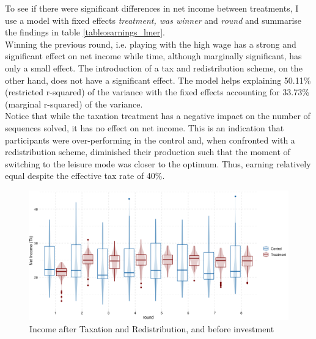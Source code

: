 To see if there were significant differences in net income between treatments, I use a model with fixed effects \textit{treatment, was winner} and \textit{round} and summarise the findings in table \ref{table:earnings_lmer}.\\

Winning the previous round, i.e. playing with the high wage has a strong and significant effect on net income while time, although marginally significant, has only a small effect. The introduction of a tax and redistribution scheme, on the other hand, does not have a significant effect. The model helps explaining 50.11\% (restricted r-squared) of the variance with the fixed effects accounting for 33.73\% (marginal r-squared) of the variance.\\

Notice that while the taxation treatment has a negative impact on the number of sequences solved, it has no effect on net income. This is an indication that participants were over-performing in the control and, when confronted with a redistribution scheme, diminished their production such that the moment of switching to the leisure mode was closer to the optimum. Thus, earning relatively equal despite the effective tax rate of 40\%.\\

\begin{figure}
    \centering
    \includegraphics[width=\textwidth]{graphs/earnings_boxplot.png}
    \caption{Income after Taxation and Redistribution, and before investment}
    \label{fig:earnings_boxplot}
\end{figure}


